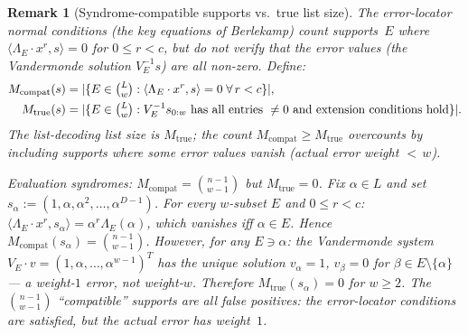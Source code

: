 \documentclass[11pt]{article}
\newtheorem{remark}[theorem]{Remark}
\begin{document}
\begin{remark}[Syndrome-compatible supports vs.\ true list size]
\label{rem:worst-case-M}
The error-locator normal conditions (the key equations of Berlekamp) count supports~$E$ where $\langle \Lambda_E \cdot x^r, s \rangle = 0$ for $0 \leq r < c$, but do \emph{not} verify that the error values (the Vandermonde solution $V_E^{-1} s$) are all non-zero. Define:
\begin{align*}
M_{\mathrm{compat}}(s) &= |\{E \in \tbinom{L}{w} : \langle \Lambda_E \cdot x^r, s \rangle = 0 \;\forall\, r < c\}|, \\
M_{\mathrm{true}}(s) &= |\{E \in \tbinom{L}{w} : V_E^{-1} s_{0:w} \text{ has all entries } \neq 0 \text{ and extension conditions hold}\}|.
\end{align*}
The \emph{list-decoding list size} is $M_{\mathrm{true}}$; the count $M_{\mathrm{compat}} \geq M_{\mathrm{true}}$ overcounts by including supports where some error values vanish (actual error weight ${<}\,w$).

\smallskip\noindent\emph{Evaluation syndromes: $M_{\mathrm{compat}} = \binom{n-1}{w-1}$ but $M_{\mathrm{true}} = 0$.}
Fix $\alpha \in L$ and set $s_\alpha := (1, \alpha, \alpha^2, \ldots, \alpha^{D-1})$.
For every $w$-subset $E$ and $0 \leq r < c$:
$\langle \Lambda_E \cdot x^r, s_\alpha \rangle = \alpha^r \Lambda_E(\alpha)$,
which vanishes iff $\alpha \in E$.
Hence $M_{\mathrm{compat}}(s_\alpha) = \binom{n-1}{w-1}$.
However, for any $E \ni \alpha$: the Vandermonde system $V_E \cdot v = (1, \alpha, \ldots, \alpha^{w-1})^T$ has the unique solution $v_\alpha = 1$, $v_\beta = 0$ for $\beta \in E \setminus \{\alpha\}$ --- a weight-$1$ error, not weight-$w$.
Therefore $M_{\mathrm{true}}(s_\alpha) = 0$ for $w \geq 2$.
The $\binom{n-1}{w-1}$ ``compatible'' supports are all \emph{false positives}: the error-locator conditions are satisfied, but the actual error has weight~$1$.


\end{remark}
\end{document}
